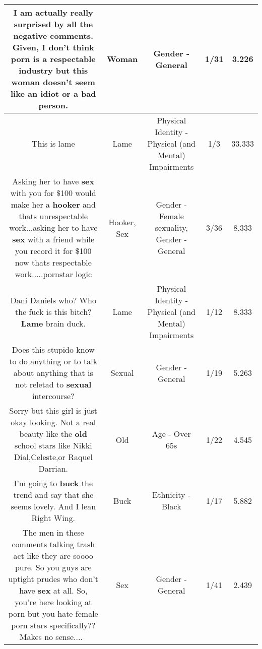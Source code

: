 \documentclass[11pt]{article}
\newlength\mylength
\begin{document}
\begin{center}
\begin{longtable}{|C{.65\mylength}|C{.30\mylength}|C{.12\mylength}|C{.12\mylength}|C{.12\mylength}|}
  \small I am actually really surprised by all the negative comments. Given, I don't think porn is a respectable industry but this \textbf{woman} doesn't seem like an idiot or a bad person.\normalsize   & Woman & Gender - General & 1/31 & 3.226 \\  \hline
  \small This is lame\normalsize   & Lame & Physical Identity - Physical (and Mental) Impairments & 1/3 & 33.333 \\  \hline
  \small Asking her to have \textbf{sex} with you for \$100 would make her a \textbf{hooker} and thats unrespectable work...asking her to have \textbf{sex} with a friend while you record it for \$100 now thats respectable work.....pornstar logic\normalsize   & Hooker, Sex & Gender - Female sexuality, Gender - General & 3/36 & 8.333 \\  \hline
  \small Dani Daniels who? Who the fuck is this bitch? \textbf{Lame} brain duck.\normalsize   & Lame & Physical Identity - Physical (and Mental) Impairments & 1/12 & 8.333 \\  \hline
  \small Does this stupido know to do anything or to talk about anything that is not reletad to \textbf{sexual} intercourse?\normalsize   & Sexual & Gender - General & 1/19 & 5.263 \\  \hline
  \small Sorry but this girl is just okay looking. Not a real beauty like the \textbf{old} school stars like Nikki Dial,Celeste,or Raquel Darrian.\normalsize   & Old & Age - Over 65s & 1/22 & 4.545 \\  \hline
  \small I'm going to \textbf{buck} the trend and say that she seems lovely. And I lean Right Wing.\normalsize   & Buck & Ethnicity - Black & 1/17 & 5.882 \\  \hline
  \small The men in these comments talking trash act like they are soooo pure. So you guys are uptight prudes who don't have \textbf{sex} at all. So, you're here looking at porn but you hate female porn stars specifically?? Makes no sense....🤔🤔\normalsize   & Sex & Gender - General & 1/41 & 2.439 \\  \hline

\end{longtable}
\end{center}
\end{document}
